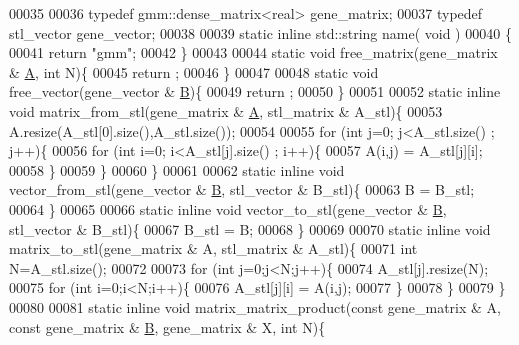\begin{DoxyCode}
00035 
00036   \textcolor{keyword}{typedef} gmm::dense\_matrix<real> gene\_matrix;
00037   \textcolor{keyword}{typedef} stl\_vector gene\_vector;
00038 
00039   \textcolor{keyword}{static} \textcolor{keyword}{inline} std::string name( \textcolor{keywordtype}{void} )
00040   \{
00041     \textcolor{keywordflow}{return} \textcolor{stringliteral}{"gmm"};
00042   \}
00043 
00044   \textcolor{keyword}{static} \textcolor{keywordtype}{void} free\_matrix(gene\_matrix & \hyperlink{group___core___module_class_eigen_1_1_matrix}{A}, \textcolor{keywordtype}{int} N)\{
00045     return ;
00046   \}
00047 
00048   \textcolor{keyword}{static} \textcolor{keywordtype}{void} free\_vector(gene\_vector & \hyperlink{group___core___module_class_eigen_1_1_matrix}{B})\{
00049     return ;
00050   \}
00051 
00052   \textcolor{keyword}{static} \textcolor{keyword}{inline} \textcolor{keywordtype}{void} matrix\_from\_stl(gene\_matrix & \hyperlink{group___core___module_class_eigen_1_1_matrix}{A}, stl\_matrix & A\_stl)\{
00053     A.resize(A\_stl[0].size(),A\_stl.size());
00054 
00055     \textcolor{keywordflow}{for} (\textcolor{keywordtype}{int} j=0; j<A\_stl.size() ; j++)\{
00056       \textcolor{keywordflow}{for} (\textcolor{keywordtype}{int} i=0; i<A\_stl[j].size() ; i++)\{
00057         A(i,j) = A\_stl[j][i];
00058       \}
00059     \}
00060   \}
00061 
00062   \textcolor{keyword}{static} \textcolor{keyword}{inline} \textcolor{keywordtype}{void} vector\_from\_stl(gene\_vector & \hyperlink{group___core___module_class_eigen_1_1_matrix}{B}, stl\_vector & B\_stl)\{
00063     B = B\_stl;
00064   \}
00065 
00066   \textcolor{keyword}{static} \textcolor{keyword}{inline} \textcolor{keywordtype}{void} vector\_to\_stl(gene\_vector & \hyperlink{group___core___module_class_eigen_1_1_matrix}{B}, stl\_vector & B\_stl)\{
00067     B\_stl = B;
00068   \}
00069 
00070   \textcolor{keyword}{static} \textcolor{keyword}{inline} \textcolor{keywordtype}{void} matrix\_to\_stl(gene\_matrix & A, stl\_matrix & A\_stl)\{
00071     \textcolor{keywordtype}{int} N=A\_stl.size();
00072 
00073     \textcolor{keywordflow}{for} (\textcolor{keywordtype}{int} j=0;j<N;j++)\{
00074       A\_stl[j].resize(N);
00075       \textcolor{keywordflow}{for} (\textcolor{keywordtype}{int} i=0;i<N;i++)\{
00076         A\_stl[j][i] = A(i,j);
00077       \}
00078     \}
00079   \}
00080 
00081   \textcolor{keyword}{static} \textcolor{keyword}{inline} \textcolor{keywordtype}{void} matrix\_matrix\_product(\textcolor{keyword}{const} gene\_matrix & A, \textcolor{keyword}{const} gene\_matrix & 
      \hyperlink{group___core___module_class_eigen_1_1_matrix}{B}, gene\_matrix & X, \textcolor{keywordtype}{int} N)\{

\end{DoxyCode}
